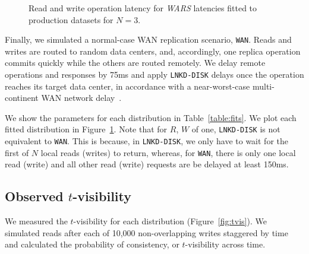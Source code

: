 \documentclass{vldb}
\begin{document}
\begin{figure}[t!]
\vspace{-8pt}
\caption{Read and write operation latency for \textit{WARS} latencies fitted
  to production datasets for $N$$=$$3$.}
\vspace{-0pt}
\label{fig:latencies}
\end{figure}

Finally, we simulated a normal-case WAN replication scenario,
\texttt{WAN}.  Reads and writes are routed to random data centers,
and, accordingly, one replica operation commits quickly while the
others are routed remotely.  We delay remote operations and responses
by 75ms and apply \texttt{LNKD-DISK} delays once the operation reaches its
target data center, in accordance with a near-worst-case
multi-continent WAN network delay~\cite{dean-keynote}.

We show the parameters for each distribution in
Table~\ref{table:fits}. We plot each fitted distribution in
Figure~\ref{fig:latencies}.  Note that for $R$, $W$ of one,
\texttt{LNKD-DISK} is not equivalent to \texttt{WAN}.  This is
because, in \texttt{LNKD-DISK}, we only have to wait for the first of
$N$ local reads (writes) to return, whereas, for \texttt{WAN}, there
is only one local read (write) and all other read (write) requests
are be delayed at least 150ms.

\subsection{Observed $t$-visibility}

We measured the $t$-visibility for each distribution
(Figure~\ref{fig:tvis}).  We simulated reads
after each of 10,000 non-overlapping writes staggered by time
and calculated the probability of consistency, or 
$t$-visibility across time.
\end{document}
